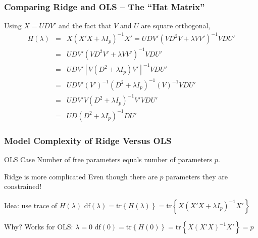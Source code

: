 \begin{frame}
  \frametitle{Comparing Ridge and OLS -- The ``Hat Matrix''}

    Using $X =UDV'$ and the fact that $V$ and $U$ are square orthogonal, 
    \begin{eqnarray*}
      H(\lambda) &=&  X\left( X'X + \lambda I_p \right)^{-1}X' = UDV'\left( VD^2V + \lambda VV' \right)^{-1}VDU'\\
      &=& UDV'\left( VD^2V' + \lambda VV' \right)^{-1}VDU'\\
      &=& UDV'\left[ V(D^2 + \lambda I_p)V' \right]^{-1}VDU'\\
      &=& UDV'\left( V' \right)^{-1}\left( D^2 + \lambda I_p \right)^{-1}\left( V \right)^{-1}VDU'\\
      &=& UDV'V\left( D^2 + \lambda I_p \right)^{-1}V'VDU'\\
      &=& UD\left( D^2 + \lambda I_p \right)^{-1}DU'
    \end{eqnarray*}



\end{frame}
\begin{frame}
  \frametitle{Model Complexity of Ridge Versus OLS}

  \begin{block}{OLS Case}
   Number of free parameters equals number of parameters $p$. 
  \end{block}

  \begin{block}{Ridge is more complicated}
    Even though there are $p$ parameters they are \alert{constrained}! 
  \end{block}

  \begin{block}{Idea: use trace of $H(\lambda)$}
    $\mbox{df}(\lambda) = \mbox{tr}\left\{ H(\lambda) \right\} = \mbox{tr}\left\{ X(X'X + \lambda I_p)^{-1}X' \right\}$
  \end{block}

  \begin{block}{Why? Works for OLS: $\lambda = 0$}
    $\mbox{df}(0) = \mbox{tr}\left\{ H(0) \right\} = \mbox{tr}\left\{ X(X'X)^{-1}X' \right\} = p$
  \end{block}

\end{frame}
